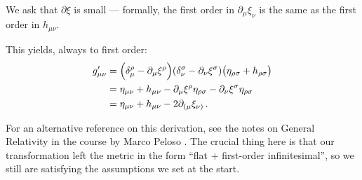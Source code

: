 \documentclass[main.tex]{subfiles}
\begin{document}
We ask that \(\partial \xi \) is small --- formally, the first order in \(\partial_{\mu } \xi_{\nu }\) is the same as the first order in \(h_{\mu \nu }\).

This yields, always to first order:
%
\begin{align}
g^{\prime }_{\mu \nu } 
&=
\qty(\delta^{\rho }_{\mu } - \partial_{\mu }\xi^{\rho })
\qty(\delta^{\sigma }_{\nu } - \partial_{\nu }\xi^{\sigma })
\qty(\eta_{\rho \sigma } + h_{\rho \sigma }) \\
&= \eta_{\mu \nu } + h_{\mu \nu } - \partial_{\mu } \xi^{\rho } \eta_{\rho \sigma } 
- \partial_{\nu }\xi^{\sigma } \eta_{\rho \sigma } \\
&= \eta_{\mu \nu } + h_{\mu \nu } - 2 \partial_{(\mu  }\xi_{\nu )}
\,.
\end{align}

For an alternative reference on this derivation, see the notes on General Relativity in the course by Marco Peloso \cite[section 10]{tissinoGeneralRelativityNotes2020}.
The crucial thing here is that our transformation left the metric in the form ``flat + first-order infinitesimal'', so we still are satisfying the assumptions we set at the start. 
\end{document}
